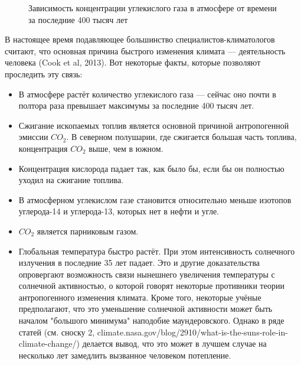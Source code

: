 \documentclass[a4paper,14pt]{article}
\begin{document}
\begin{enumerate}
\begin{figure}[h!]
\caption{Зависимость концентрации углекислого газа в атмосфере от времени за последние 400 тысяч лет}
\end{figure}

\end{enumerate}

В настоящее время подавляющее большинство специалистов-климатологов считают, что основная причина быстрого изменения климата --- деятельность человека (Cook et al, 2013). Вот некоторые факты, которые позволяют проследить эту связь:
\begin{itemize}
\item В атмосфере растёт количество углекислого газа --- сейчас оно почти в полтора раза превышает максимумы за последние 400 тысяч лет. 
\item Сжигание ископаемых топлив является основной причиной антропогенной эмиссии $CO_{2}$. В северном полушарии, где сжигается большая часть топлива, концентрация $CO_{2}$ выше, чем в южном.
\item Концентрация кислорода падает так, как было бы, если бы он полностью уходил на сжигание топлива.
\item В атмосферном углекислом газе становится относительно меньше изотопов углерода-14 и углерода-13, которых нет в нефти и угле.
\item $CO_{2}$ является парниковым газом.
\item Глобальная температура быстро растёт. При этом интенсивность солнечного излучения в последние 35 лет падает. Это и другие доказательства опровергают возможность связи нынешнего увеличения температуры с солнечной активностью, о которой говорят некоторые противники теории антропогенного изменения климата. Кроме того, некоторые учёные предполагают, что это уменьшение солнечной активности может быть началом "большого минимума" наподобие маундеровского. Однако в ряде статей (см. сноску 2, climate.nasa.gov/blog/2910/what-is-the-suns-role-in-climate-change/) делается вывод, что это может в лучшем случае на несколько лет замедлить вызванное человеком потепление.
\end{itemize}
\end{document}
